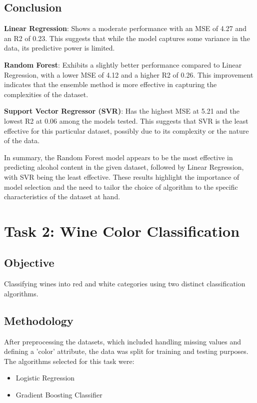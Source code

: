\documentclass{article}
\begin{document}
    \subsection{Conclusion}
    \textbf{Linear Regression}: Shows a moderate performance with an MSE of 4.27 and an R2 of 0.23. This suggests that while the model captures some variance in the data, its predictive power is limited.

    \textbf{Random Forest}: Exhibits a slightly better performance compared to Linear Regression, with a lower MSE of 4.12 and a higher R2 of 0.26. This improvement indicates that the ensemble method is more effective in capturing the complexities of the dataset.

    \textbf{Support Vector Regressor (SVR)}: Has the highest MSE at 5.21 and the lowest R2 at 0.06 among the models tested. This suggests that SVR is the least effective for this particular dataset, possibly due to its complexity or the nature of the data.

In summary, the Random Forest model appears to be the most effective in predicting alcohol content in the given dataset, followed by Linear Regression, with SVR being the least effective. These results highlight the importance of model selection and the need to tailor the choice of algorithm to the specific characteristics of the dataset at hand.

\section{Task 2: Wine Color Classification}

    \subsection{Objective}
    Classifying wines into red and white categories using two distinct classification algorithms.

    \subsection{Methodology}
    After preprocessing the datasets, which included handling missing values and defining a 'color' attribute, the data was split for training and testing purposes. The algorithms selected for this task were:
    \begin{itemize}
        \item Logistic Regression
        \item Gradient Boosting Classifier
    \end{itemize}
\end{document}
